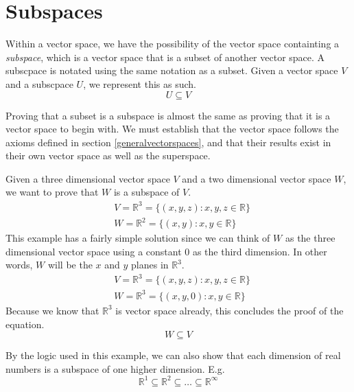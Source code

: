 \section{Subspaces}\label{subspaces}

Within a vector space, we have the possibility of the vector space containting a
\emph{subspace}, which is a vector space that is a subset of another vector
space. A subscpace is notated using the same notation as a subset. Given a
vector space $V$ and a subscpace $U$, we represent this as such.
\begin{equation*}
    U \subseteq V
\end{equation*}

Proving that a subset is a subspace is almost the same as proving that it is a
vector space to begin with. We must establish that the vector space follows the
axioms defined in section \ref{generalvectorspaces}, and that their results
exist in their own vector space as well as the superspace.

\begin{exmp}
    Given a three dimensional vector space $V$ and a two dimensional vector
    space $W$, we want to prove that $W$ is a subspace of $V$.
    \begin{align*}
        &V = \mathbb{R}^3 = \{(x,y,z): x,y,z \in \mathbb{R}\}\\
        &W = \mathbb{R}^2 = \{(x,y): x,y \in \mathbb{R}\}
    \end{align*}
    This example has a fairly simple solution since we can think of $W$ as the
    three dimensional vector space using a constant $0$ as the third dimension.
    In other words, $W$ will be the $x$ and $y$ planes in $\mathbb{R}^3$.
    \begin{align*}
        &V = \mathbb{R}^3 = \{(x,y,z): x,y,z \in \mathbb{R}\}\\
        &W = \mathbb{R}^3 = \{(x,y,0): x,y \in \mathbb{R}\}
    \end{align*}
    Because we know that $\mathbb{R}^3$ is vector space already, this concludes
    the proof of the equation. 
    \begin{equation*}
        W \subseteq V
    \end{equation*}
\end{exmp}

By the logic used in this example, we can also show that each dimension of real
numbers is a subspace of one higher dimension. E.g.
\begin{equation*}
    \mathbb{R}^1 \subseteq \mathbb{R}^2 \subseteq \hdots \subseteq
    \mathbb{R}^\infty
\end{equation*}

